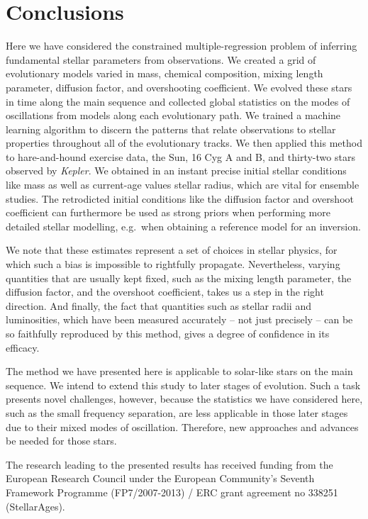 \documentclass[manuscript]{aastex}
\begin{document}
\section{Conclusions}
Here we have considered the constrained multiple-regression problem of inferring fundamental stellar parameters from observations. We created a grid of evolutionary models varied in mass, chemical composition, mixing length parameter, diffusion factor, and overshooting coefficient. We evolved these stars in time along the main sequence and collected global statistics on the modes of oscillations from models along each evolutionary path. We trained a machine learning algorithm to discern the patterns that relate observations to stellar properties throughout all of the evolutionary tracks. We then applied this method to hare-and-hound exercise data, the Sun, 16 Cyg A and B, and thirty-two stars observed by \emph{Kepler}. We obtained in an instant precise initial stellar conditions like mass as well as current-age values stellar radius, which are vital for ensemble studies. The retrodicted initial conditions like the diffusion factor and overshoot coefficient can furthermore be used as strong priors when performing more detailed stellar modelling, e.g.~when obtaining a reference model for an inversion. 

We note that these estimates represent a set of choices in stellar physics, for which such a bias is impossible to rightfully propagate. Nevertheless, varying quantities that are usually kept fixed, such as the mixing length parameter, the diffusion factor, and the overshoot coefficient, takes us a step in the right direction. And finally, the fact that quantities such as stellar radii and luminosities, which have been measured accurately -- not just precisely -- can be so faithfully reproduced by this method, gives a degree of confidence in its efficacy. 

The method we have presented here is applicable to solar-like stars on the main sequence. We intend to extend this study to later stages of evolution. Such a task presents novel challenges, however, because the statistics we have considered here, such as the small frequency separation, are less applicable in those later stages due to their mixed modes of oscillation. Therefore, new approaches and advances be needed for those stars. 

\acknowledgments The research leading to the presented results has received funding from the European Research Council under the European Community's Seventh Framework Programme (FP7/2007-2013) / ERC grant agreement no 338251 (StellarAges). 
\end{document}
